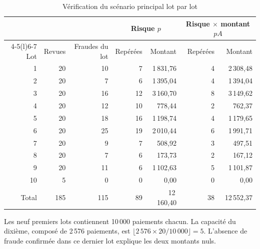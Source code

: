 \documentclass[11pt,a4paper]{article}
\begin{document}
\begin{table}[htbp]\centering\small
\caption{Vérification du scénario principal lot par lot}\label{tab:lots-detail}
\begin{tabular}{@{}rrrrrrr@{}}\toprule
& & & \multicolumn{2}{c}{Risque $p$}&\multicolumn{2}{c}{Risque $\times$ montant $pA$}\\
\cmidrule(lr){4-5}\cmidrule(l){6-7}
Lot & Revues & Fraudes du lot & Repérées & Montant & Repérées & Montant\\
\midrule
1&20&10&7&1\,831,76&4&2\,308,48\\
2&20&7&6&1\,395,04&4&1\,394,04\\
3&20&16&12&3\,160,70&8&3\,149,62\\
4&20&12&10&778,44&2&762,37\\
5&20&18&16&1\,198,74&4&1\,179,65\\
6&20&25&19&2\,010,44&6&1\,991,71\\
7&20&9&7&508,92&3&497,51\\
8&20&7&6&173,73&2&167,12\\
9&20&11&6&1\,102,63&5&1\,101,87\\
10&5&0&0&0,00&0&0,00\\
\midrule
Total&185&115&89&12\,160,40&38&12\,552,37\\\bottomrule
\end{tabular}
\end{table}

Les neuf premiers lots contiennent 10\,000 paiements chacun. La capacité du dixième, composé de 2\,576 paiements, est $\lfloor 2\,576\times 20/10\,000\rfloor=5$. L'absence de fraude confirmée dans ce dernier lot explique les deux montants nuls.
\end{document}
